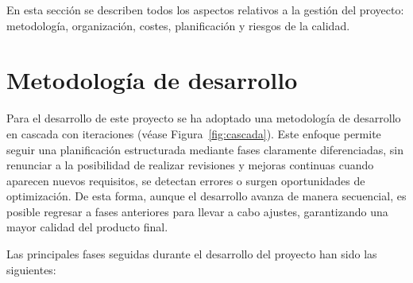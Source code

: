 En esta sección se describen todos los aspectos relativos a la gestión del proyecto: metodología, organización, costes, planificación y riesgos de la calidad.

\section{Metodología de desarrollo}

Para el desarrollo de este proyecto se ha adoptado una metodología de desarrollo en cascada con iteraciones (véase Figura~\ref{fig:cascada}). Este enfoque permite seguir una planificación estructurada mediante fases claramente diferenciadas, sin renunciar a la posibilidad de realizar revisiones y mejoras continuas cuando aparecen nuevos requisitos, se detectan errores o surgen oportunidades de optimización. De esta forma, aunque el desarrollo avanza de manera secuencial, es posible regresar a fases anteriores para llevar a cabo ajustes, garantizando una mayor calidad del producto final.

Las principales fases seguidas durante el desarrollo del proyecto han sido las siguientes:

